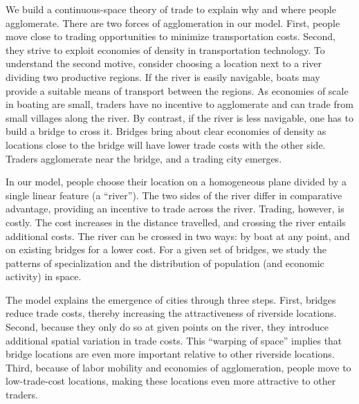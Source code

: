 \documentclass[12pt]{article}
\begin{document}
We build a continuous-space theory of trade to explain why and where people
agglomerate. There are two forces of agglomeration in our model. First,
people move close to trading opportunities to minimize transportation costs.
Second, they strive to exploit economies of density in transportation
technology. To understand the second motive, consider choosing a location
next to a river dividing two productive regions. If the river is easily
navigable, boats may provide a suitable means of transport between the
regions. As economies of scale in boating are small, traders have no
incentive to agglomerate and can trade from small villages along the river.
By contrast, if the river is less navigable, one has to build a bridge to
cross it. Bridges bring about clear economies of density as locations close
to the bridge will have lower trade costs with the other side. Traders
agglomerate near the bridge, and a trading city emerges.

In our model, people choose their location on a homogeneous plane divided by
a single linear feature (a \textquotedblleft river\textquotedblright ). The
two sides of the river differ in comparative advantage, providing an
incentive to trade across the river. Trading, however, is costly. The cost
increases in the distance travelled, and crossing the river entails
additional costs. The river can be crossed in two ways: by boat at any
point, and on existing bridges for a lower cost. For a given set of bridges,
we study the patterns of specialization and the distribution of population
(and economic activity) in space.

The model explains the emergence of cities through three steps. First, bridges reduce trade costs, thereby increasing the attractiveness of riverside locations. Second, because they only do so at given points on the river, they introduce additional spatial variation in trade costs. This ``warping of space'' implies that bridge locations are even more important relative to other riverside locations. Third, because of labor mobility and economies of agglomeration, people move to low-trade-cost locations, making these locations even more attractive to other traders.
\end{document}
